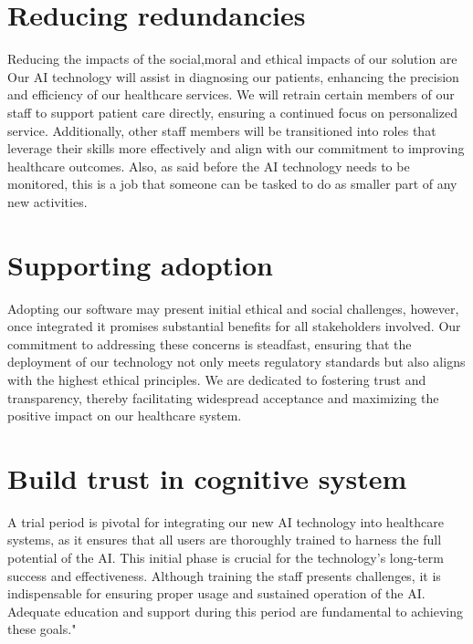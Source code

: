 \documentclass{article}
\begin{document}
\section{Reducing redundancies}
Reducing the impacts of the social,moral and ethical impacts of our solution are  
Our AI technology will assist in diagnosing our patients, enhancing the precision and efficiency of our healthcare services. We will retrain certain members of our staff to support patient care directly, ensuring a continued focus on personalized service. Additionally, other staff members will be transitioned into roles that leverage their skills more effectively and align with our commitment to improving healthcare outcomes. Also, as said before the AI technology needs to be monitored, this is a job that someone can be tasked to do as smaller part of any new activities.



\section{Supporting adoption}
Adopting our software may present initial ethical and social challenges, however, once integrated it promises substantial benefits for all stakeholders involved. Our commitment to addressing these concerns is steadfast, ensuring that the deployment of our technology not only meets regulatory standards but also aligns with the highest ethical principles. We are dedicated to fostering trust and transparency, thereby facilitating widespread acceptance and maximizing the positive impact on our healthcare system.


\section{Build trust in cognitive system}
A trial period is pivotal for integrating our new AI technology into healthcare systems, as it ensures that all users are thoroughly trained to harness the full potential of the AI. This initial phase is crucial for the technology’s long-term success and effectiveness. Although training the staff presents challenges, it is indispensable for ensuring proper usage and sustained operation of the AI. Adequate education and support during this period are fundamental to achieving these goals."
\end{document}

